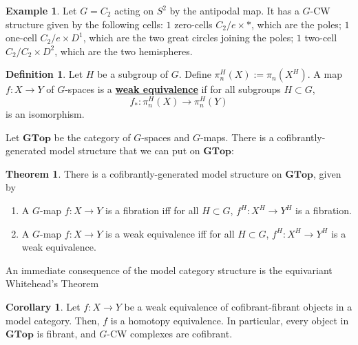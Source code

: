 \documentclass{article}
\theoremstyle{definition}
\newtheorem{theorem}{Theorem}[section]
\theoremstyle{definition}
\newtheorem{definition}{Definition}[theorem]
\theoremstyle{definition}
\theoremstyle{definition}
\theoremstyle{definition}
\theoremstyle{definition}
\newtheorem{corollary}{Corollary}[theorem]
\theoremstyle{definition}
\newtheorem{example}{Example}[theorem]
\begin{document}
\begin{tcolorbox}[colback=yellow!5!white,colframe=yellow!30!white]
\begin{example}
    Let $G=C_2$ acting on $S^2$ by the antipodal map. It has a $G$-CW structure given by the following cells: $1$ zero-cells $C_2/e\times *$, which are the poles; $1$ one-cell $C_2/e\times D^1$, which are the two great circles joining the poles; $1$ two-cell $C_2/C_2\times D^2$, which are the two hemispheres. 
\end{example}
\end{tcolorbox}


\begin{tcolorbox}[colback=purple!5!white,colframe=purple!75!black]
\begin{definition}
Let $H$ be a subgroup of $G$. Define $\pi_n^H(X):=\pi_n(X^H)$. A map $f: X\to Y$ of $G$-spaces is a \underline{\textbf{weak equivalence}} if for all subgroups $H\subset G$,
\[f_*:\pi_n^H(X)\to \pi_n^H(Y)\]
is an isomorphism. 
\end{definition}
\end{tcolorbox}

Let $\textbf{GTop}$ be the category of $G$-spaces and $G$-maps. There is a cofibrantly-generated model structure that we can put on $\textbf{GTop}$:

\begin{tcolorbox}[colback=red!5!white,colframe=red!30!white]
\begin{theorem}
    There is a cofibrantly-generated model structure on $\textbf{GTop}$, given by 
    \begin{enumerate}
        \item A $G$-map $f:X\to Y$ is a fibration iff for all $H\subset G$, $f^H: X^H\to Y^H$ is a fibration.
        \item A $G$-map $f:X\to Y$ is a weak equivalence iff for all $H\subset G$, $f^H: X^H\to Y^H$ is a weak equivalence. 
    \end{enumerate}
\end{theorem}
\end{tcolorbox}
An immediate consequence of the model category structure is the equivariant Whitehead's Theorem

\begin{tcolorbox}[colback=green!5!white,colframe=green!30!white]
\begin{corollary}
Let $f: X\to Y$ be a weak equivalence of cofibrant-fibrant objects in a model category. Then, $f$ is a homotopy equivalence. In particular, every object in $\textbf{GTop}$ is fibrant, and $G$-CW complexes are  cofibrant. 
\end{corollary}
\end{tcolorbox}
\end{document}
